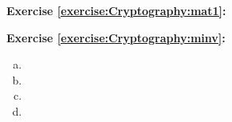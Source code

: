 \noindent\textbf{Exercise \ref{exercise:Cryptography:mat1}:}

\noindent\textbf{Exercise \ref{exercise:Cryptography:minv}:}
\begin{multicols}{2}
\begin{enumerate}[(a)]
\item
\item
\item
\item
\end{enumerate}
\end{multicols}


 

